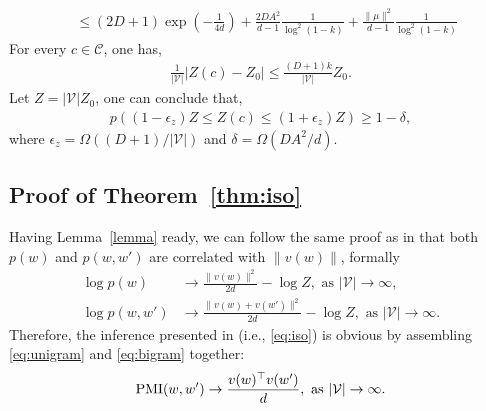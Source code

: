 \documentclass{article} \usepackage{acl2017,times}
\newenvironment{proof}[1][Proof]{\begin{trivlist}
\item[\hskip \labelsep {\bfseries #1}]}{\end{trivlist}}
\begin{document}
\begin{proof}
\begin{align*}
& \le (2D+1)\exp(-\frac{1}{4d}) + \frac{2DA^2}{d-1}\frac{1}{\log^2(1-k)} + \frac{\|\mu\|^2}{d-1}\frac{1}{\log^2(1-k)}
\end{align*}
For every $c\in \mathcal{C}$, one has, 
\begin{align*}
    \frac{1}{|\mathcal{V}|}\left|Z(c) - Z_0\right| \le \frac{(D+1)k}{|\mathcal{V}|}Z_0.
\end{align*}
Let $Z = |\mathcal{V}|Z_0$, one can conclude that,
\begin{align*}
    p((1-\epsilon_z)Z \le Z(c) \le (1+\epsilon_z) Z) \ge 1-\delta,
\end{align*}
where $\epsilon_z = \Omega((D+1)/|\mathcal{V}|)$ and $\delta = \Omega(DA^2/d)$.
\end{proof}

\subsection{Proof of Theorem~\ref{thm:iso}}

Having Lemma~\ref{lemma} ready, we can follow the same proof as in \citep{arora2015rand} that both $p(w)$ and $p(w, w')$ are correlated with $\|v(w)\|$, formally
    \begin{align}
        \log p(w) &\to \frac{\|v(w)\|^2}{2d} - \log Z, \textrm { as $|\mathcal{V}|\to \infty$},  \label{eq:unigram} \\
        \log p(w, w') &\to \frac{\|v(w) + v(w')\|^2}{2d} - \log Z, \textrm  { as $|\mathcal{V}|\to \infty$}.  \label{eq:bigram}
    \end{align}
Therefore, the inference presented in \citep{arora2015rand} (i.e., \eqref{eq:iso}) is obvious by assembling \eqref{eq:unigram} and \eqref{eq:bigram} together:
\begin{align*}
    {\rm PMI}(w, w') \to \frac{v(w)^{\top}v(w')}{d}, \textrm{ as $|\mathcal{V}|\to\infty$}.
\end{align*}
\end{document}
